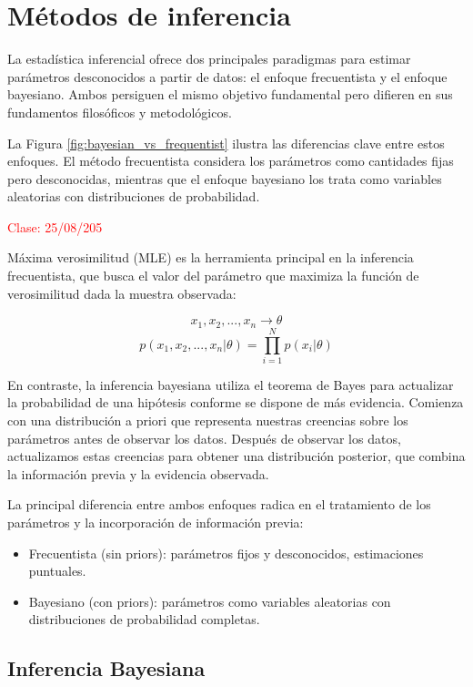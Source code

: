 \section{Métodos de inferencia}

La estadística inferencial ofrece dos principales paradigmas para estimar parámetros desconocidos a partir de datos: el enfoque frecuentista y el enfoque bayesiano. Ambos persiguen el mismo objetivo fundamental pero difieren en sus fundamentos filosóficos y metodológicos.



La Figura \ref{fig:bayesian_vs_frequentist} ilustra las diferencias clave entre estos enfoques. El método frecuentista considera los parámetros como cantidades fijas pero desconocidas, mientras que el enfoque bayesiano los trata como variables aleatorias con distribuciones de probabilidad.

\textcolor{red}{Clase: 25/08/205}

Máxima verosimilitud (MLE) es la herramienta principal en la inferencia frecuentista, que busca el valor del parámetro que maximiza la función de verosimilitud dada la muestra observada:

\[x_1,x_2, ..., x_n \rightarrow \theta \]
\[p(x_1, x_2, ..., x_n | \theta) = \prod_{i=1}^{N}p(x_{i} | \theta) \]

En contraste, la inferencia bayesiana utiliza el teorema de Bayes para actualizar la probabilidad de una hipótesis conforme se dispone de más evidencia. Comienza con una distribución a priori que representa nuestras creencias sobre los parámetros antes de observar los datos. Después de observar los datos, actualizamos estas creencias para obtener una distribución posterior, que combina la información previa y la evidencia observada.

La principal diferencia entre ambos enfoques radica en el tratamiento de los parámetros y la incorporación de información previa:

\begin{itemize}
    \item Frecuentista (sin priors): parámetros fijos y desconocidos, estimaciones puntuales.
    \item Bayesiano (con priors): parámetros como variables aleatorias con distribuciones de probabilidad completas.
\end{itemize}


\subsection{Inferencia Bayesiana}

